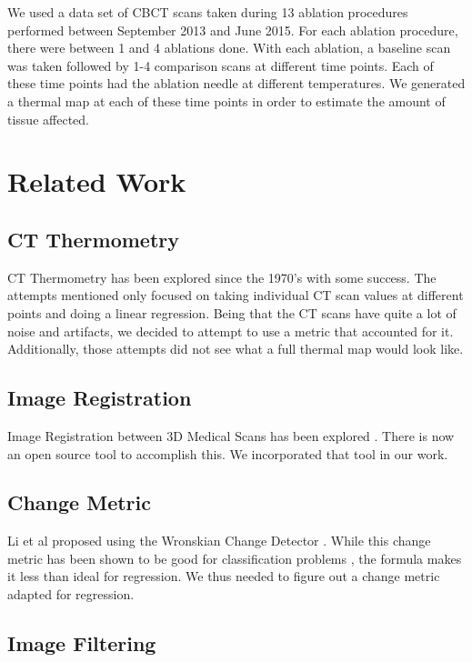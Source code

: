 \documentclass[]{spie}  %
\begin{document}
We used a data set of CBCT scans taken during 13 ablation procedures performed between September 2013 and June 2015. For each ablation procedure, there were between 1 and 4 ablations done. With each ablation, a baseline scan was taken followed by 1-4 comparison scans at different time points. Each of these time points had the ablation needle at different temperatures. We generated a thermal map at each of these time points in order to estimate the amount of tissue affected. 

\section{Related Work}

\subsection{CT Thermometry}

CT Thermometry has been explored since the 1970's with some success\cite{Fani14}. The attempts mentioned only focused on taking individual CT scan values at different points and doing a linear regression. Being that the CT scans have quite a lot of noise and artifacts, we decided to attempt to use a metric that accounted for it. Additionally, those attempts did not see what a full thermal map would look like.

\subsection{Image Registration}

Image Registration between 3D Medical Scans has been explored \cite{Ourselin01,Modat10}. There is now an open source tool to accomplish this. We incorporated that tool in our work.  

\subsection{Change Metric}

Li et al \cite{Li13} proposed using the Wronskian Change Detector \cite{Durucan01}. While this change metric has been shown to be good for classification problems \cite{Panda13,Durucan01,Ang11,Subudhi13}, the formula makes it less than ideal for regression. We thus needed to figure out a change metric adapted for regression.

\subsection{Image Filtering}
\end{document}
